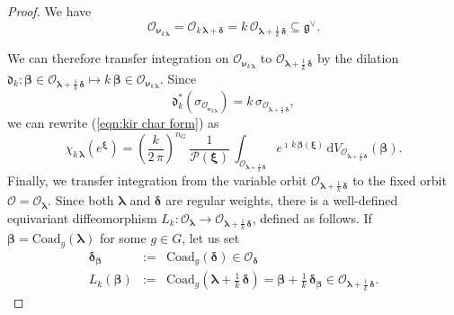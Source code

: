 \documentclass[12pt,a4paper]{article}
\theoremstyle{plain}
\theoremstyle{definition}
\begin{document}
\begin{proof}
We have
$$
\mathcal{O}_{\boldsymbol{\nu}_{k\,\boldsymbol{\lambda}}}=
\mathcal{O}_{k\,\boldsymbol{\lambda}+
\boldsymbol{\delta}}
=k\,\mathcal{O}_{\boldsymbol{\lambda}+\frac{1}{k}\,
\boldsymbol{\delta}}\subseteq \mathfrak{g}^\vee.
$$

We can therefore transfer integration on 
$\mathcal{O}_{\boldsymbol{\nu}_{k\,\boldsymbol{\lambda}}}$
to $\mathcal{O}_{\boldsymbol{\lambda}+\frac{1}{k}\,
\boldsymbol{\delta}}$ by the dilation 
$\mathfrak{d} _k:
\boldsymbol{\beta}\in \mathcal{O}_{\boldsymbol{\lambda}+\frac{1}{k}\,
\boldsymbol{\delta}}\mapsto k\,\boldsymbol{\beta}
\in \mathcal{O}_{\boldsymbol{\nu}_{k\,\boldsymbol{\lambda}}}$.
Since 
$$\mathfrak{d} _k^*(\sigma_{\mathcal{O}_{\boldsymbol{\nu}_{k\,\boldsymbol{\lambda}}}})=
k\,\sigma_{\mathcal{O}_{\boldsymbol{\lambda}+\frac{1}{k}\,
\boldsymbol{\delta}}},
$$ 
we can rewrite (\ref{eqn:kir char form}) as 
\begin{equation}
\label{eqn:kir char form rescaled}
\chi_{k\,\boldsymbol{\lambda}}
\left(e^{\boldsymbol{\xi}}\right)
=\left(\frac{k}{2\,\pi}\right)^{n_G}\,
\frac{1}{\mathcal{P}(\boldsymbol{\xi})}\,
\int_{\mathcal{O}_{\boldsymbol{\lambda}+\frac{1}{k}\,
\boldsymbol{\delta}}}
e^{\imath\,k\,\boldsymbol{\beta}(\boldsymbol{\xi})}\,
\mathrm{d}
V_{\mathcal{O}_{\boldsymbol{\lambda}+\frac{1}{k}\,
\boldsymbol{\delta}}}
(\boldsymbol{\beta}).
\end{equation}
%
Finally, we transfer integration from the
variable orbit $\mathcal{O}_{\boldsymbol{\lambda}+\frac{1}{k}\,
\boldsymbol{\delta}}$ to the fixed orbit 
$\mathcal{O}=\mathcal{O}_{\boldsymbol{\lambda}}$.
Since both $\boldsymbol{\lambda}$ and $\boldsymbol{\delta}$
are regular weights, there is a well-defined equivariant diffeomorphism
$L_k:\mathcal{O}_{\boldsymbol{\lambda}}\rightarrow
\mathcal{O}_{\boldsymbol{\lambda}+\frac{1}{k}\,
\boldsymbol{\delta}}$, defined as follows.
If $\boldsymbol{\beta}=\mathrm{Coad}_g(\boldsymbol{\lambda})$
for some $g\in G$, let us set
\begin{eqnarray}
\label{eqn:delta beta}
\boldsymbol{\delta}_{\boldsymbol{\beta}}&:=&
\mathrm{Coad}_g(\boldsymbol{\delta})\in \mathcal{O}_{\boldsymbol{\delta}}\\
L_k(\boldsymbol{\beta})&:=&\mathrm{Coad}_g\left(\boldsymbol{\lambda}+\frac{1}{k}\,
\boldsymbol{\delta}\right)=\boldsymbol{\beta}+
\frac{1}{k}\,\boldsymbol{\delta}_{\boldsymbol{\beta}}\in \mathcal{O}_{\boldsymbol{\lambda}+\frac{1}{k}\,
\boldsymbol{\delta}}.

\end{eqnarray}
\end{proof}
\end{document}
